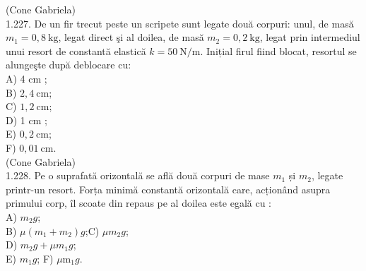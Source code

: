 \documentclass[10pt]{article}
\begin{document}
(Cone Gabriela)\\
1.227. De un fir trecut peste un scripete sunt legate două corpuri: unul, de masă $m_{1}=0,8 \mathrm{~kg}$, legat direct şi al doilea, de masă $m_{2}=0,2 \mathrm{~kg}$, legat prin intermediul unui resort de constantă elastică $k=50 \mathrm{~N} / \mathrm{m}$. Inițial firul fiind blocat, resortul se alungeşte după deblocare cu:\\
A) 4 cm ;\\
B) $2,4 \mathrm{~cm}$;\\
C) $1,2 \mathrm{~cm}$;\\
D) 1 cm ;\\
E) $0,2 \mathrm{~cm}$;\\
F) $0,01 \mathrm{~cm}$.\\
(Cone Gabriela)\\
1.228. Pe o suprafată orizontală se află două corpuri de mase $m_{1}$ și $m_{2}$, legate printr-un resort. Forța minimă constantă orizontală care, acționând asupra primului corp, îl scoate din repaus pe al doilea este egală cu :\\
A) $m_{2} g$;\\
B) $\mu\left(m_{1}+m_{2}\right) g$;C) $\mu m_{2} g$;\\
D) $m_{2} g+\mu m_{1} g$;\\
E) $m_{1} g$; F) $\mu \mathrm{m}_{1} g$.
\end{document}
